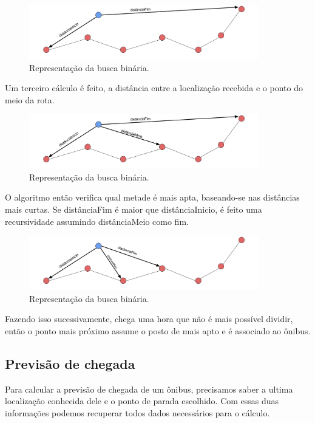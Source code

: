 \documentclass[
	12pt,				%
	oneside,			%
	a4paper,			%
	brazil				%
]{abntex2}
\begin{document}
\begin{figure}[!h]
\centering
\includegraphics[width=10cm, center]{images/distanciainicio-distanciafim.png}
\caption{Representação da busca binária.}
\label{Rotulo}
\end{figure}

Um terceiro cálculo é feito, a distância entre a localização recebida e o ponto do meio da rota.

\begin{figure}[!h]
\centering
\includegraphics[width=10cm, center]{images/distanciainicio-distanciafim-distanciomeio.png}
\caption{Representação da busca binária.}
\label{Rotulo}
\end{figure}

O algoritmo então verifica qual metade é mais apta, baseando-se nas distâncias mais curtas. Se distânciaFim é maior que distânciaInicio, é feito uma recursividade assumindo distânciaMeio como fim.

\begin{figure}[!h]
\centering
\includegraphics[width=10cm, center]{images/nova-distancia.png}
\caption{Representação da busca binária.}
\label{Rotulo}
\end{figure}

Fazendo isso sucessivamente, chega uma hora que não é mais possível dividir, então o ponto mais próximo assume o posto de mais apto e é associado ao ônibus.

\subsection{Previsão de chegada}

Para calcular a previsão de chegada de um ônibus, precisamos saber a ultima localização conhecida dele e o ponto de parada escolhido. Com essas duas informações podemos recuperar todos dados necessários para o cálculo.
\end{document}

